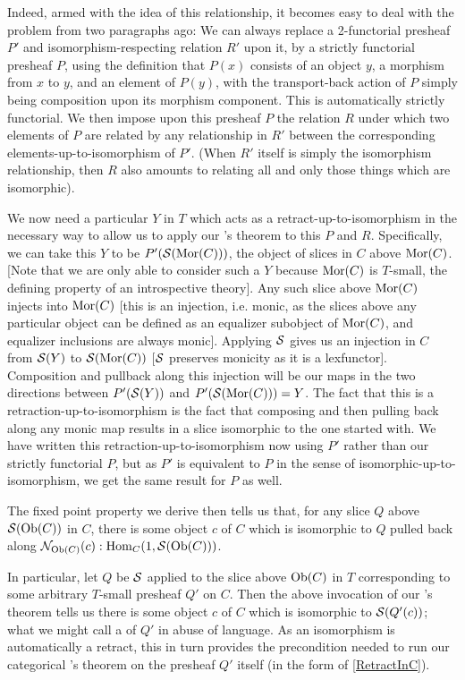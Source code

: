 Indeed, armed with the idea of this relationship, it becomes easy to deal with the problem from two paragraphs ago: We can always replace a 2-functorial presheaf $P'$ and isomorphism-respecting relation $R'$ upon it, by a strictly functorial presheaf $P$, using the definition that $P(x)$ consists of an object $y$, a morphism from $x$ to $y$, and an element of $P(y)$, with the transport-back action of $P$ simply being composition upon its morphism component. This is automatically strictly functorial. We then impose upon this presheaf $P$ the relation $R$ under which two elements of $P$ are related by any relationship in $R'$ between the corresponding elements-up-to-isomorphism of $P'$. (When $R'$ itself is simply the isomorphism relationship, then $R$ also amounts to relating all and only those things which are isomorphic). 

We now need a particular $Y$ in $T$ which acts as a retract-up-to-isomorphism in the necessary way to allow us to apply our \Loeb's theorem to this $P$ and $R$. Specifically, we can take this $Y$ to be $P'(\mathcal{S}(\operatorname{Mor}(C)))$, the object of slices in $C$ above $\operatorname{Mor}(C)$. [Note that we are only able to consider such a $Y$ because $\operatorname{Mor}(C)$ is $T$-small, the defining property of an introspective theory]. Any such slice above $\operatorname{Mor}(C)$ injects into $\operatorname{Mor}(C)$ [this is an injection, i.e. monic, as the slices above any particular object can be defined as an equalizer subobject of $\operatorname{Mor}(C)$, and equalizer inclusions are always monic]. Applying $\mathcal{S}$ gives us an injection in $C$ from $\mathcal{S}(Y)$ to $\mathcal{S}(\operatorname{Mor}(C))$ [$\mathcal{S}$ preserves monicity as it is a lexfunctor]. Composition and pullback along this injection will be our maps in the two directions between $P'(\mathcal{S}(Y))$ and $P'(\mathcal{S}(\operatorname{Mor}(C))) = Y$. The fact that this is a retraction-up-to-isomorphism is the fact that composing and then pulling back along any monic map results in a slice isomorphic to the one started with. We have written this retraction-up-to-isomorphism now using $P'$ rather than our strictly functorial $P$, but as $P'$ is equivalent to $P$ in the sense of isomorphic-up-to-isomorphism, we get the same result for $P$ as well. 

The fixed point property we derive then tells us that, for any slice $Q$ above $\mathcal{S}(\operatorname{Ob}(C))$ in $C$, there is some object $c$ of $C$ which is isomorphic to $Q$ pulled back along $\mathcal{N}_{\operatorname{Ob}(C)}(c) : \operatorname{Hom}_C(1, \mathcal{S}(\operatorname{Ob}(C)))$.

In particular, let $Q$ be $\mathcal{S}$ applied to the slice above $\operatorname{Ob}(C)$ in $T$ corresponding to some arbitrary $T$-small presheaf $Q'$ on $C$. Then the above invocation of our \Loeb's theorem tells us there is some object $c$ of $C$ which is isomorphic to $\mathcal{S}(Q'(c))$; what we might call a  of $Q'$ in abuse of language. As an isomorphism is automatically a retract, this in turn provides the precondition needed to run our categorical \Loeb's theorem on the presheaf $Q'$ itself (in the form of \cref{RetractInC}).

